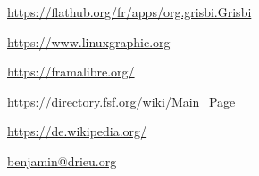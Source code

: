 \urldef{\urlFlatpakGrisbi}%
\url{https://flathub.org/fr/apps/org.grisbi.Grisbi}

\urldef{\urlLinuxGraphic}%
\url{https://www.linuxgraphic.org}

\urldef{\urlFramasoftLogiciels}%
\url{https://framalibre.org/}

\urldef{\urlFreeSoftwareDirectory}%
\url{https://directory.fsf.org/wiki/Main_Page}







\urldef{\urlWikipedia}%
\url{https://de.wikipedia.org/}






\urldef{\urlBenjaminDrieuEmail}%
\url{benjamin@drieu.org}     %




